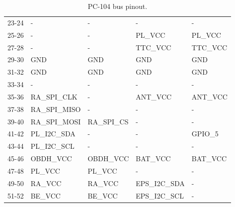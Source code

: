 \begin{table}[!h]
\begin{tabular}{cllll}
        23-24              & -                & -                & -               & -                \\
        25-26              & -                & -                & PL\_VCC         & PL\_VCC          \\
        27-28              & -                & -                & TTC\_VCC        & TTC\_VCC         \\
        29-30              & GND              & GND              & GND             & GND              \\
        31-32              & GND              & GND              & GND             & GND              \\
        33-34              & -                & -                & -               & -                \\
        35-36              & RA\_SPI\_CLK     & -                & ANT\_VCC        & ANT\_VCC         \\
        37-38              & RA\_SPI\_MISO    & -                & -               & -                \\
        39-40              & RA\_SPI\_MOSI    & RA\_SPI\_CS      & -               & -                \\
        41-42              & PL\_I2C\_SDA     & -                & -               & GPIO\_5          \\
        43-44              & PL\_I2C\_SCL     & -                & -               & -                \\
        45-46              & OBDH\_VCC        & OBDH\_VCC        & BAT\_VCC        & BAT\_VCC         \\
        47-48              & PL\_VCC          & PL\_VCC          & -               & -                \\
        49-50              & RA\_VCC          & RA\_VCC          & EPS\_I2C\_SDA   & -                \\
        51-52              & BE\_VCC          & BE\_VCC          & EPS\_I2C\_SCL   & -                \\
        \bottomrule[1.5pt]
    \end{tabular}
    \caption{PC-104 bus pinout.}
    \label{tab:pc104-pinout}
\end{table}

